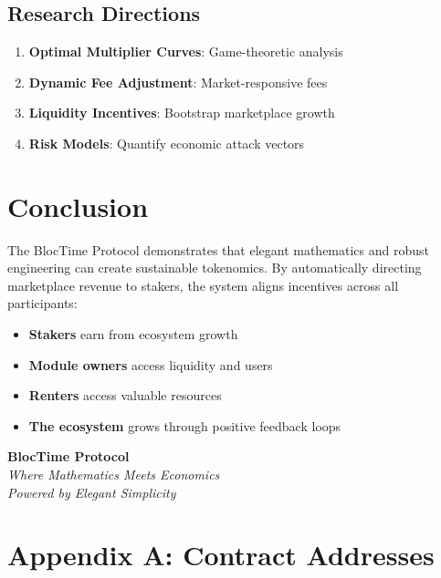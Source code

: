 \documentclass[12pt,a4paper]{article}
\begin{document}
\subsection{Research Directions}

\begin{enumerate}
    \item \textbf{Optimal Multiplier Curves}: Game-theoretic analysis
    \item \textbf{Dynamic Fee Adjustment}: Market-responsive fees
    \item \textbf{Liquidity Incentives}: Bootstrap marketplace growth
    \item \textbf{Risk Models}: Quantify economic attack vectors
\end{enumerate}

\section{Conclusion}

The BlocTime Protocol demonstrates that elegant mathematics and robust engineering can create sustainable tokenomics. By automatically directing marketplace revenue to stakers, the system aligns incentives across all participants:

\begin{itemize}
    \item \textbf{Stakers} earn from ecosystem growth
    \item \textbf{Module owners} access liquidity and users
    \item \textbf{Renters} access valuable resources
    \item \textbf{The ecosystem} grows through positive feedback loops
\end{itemize}

\vspace{1cm}

\begin{center}
\textcolor{primaryblue}{\textbf{\Large BlocTime Protocol}}\\
\vspace{0.3cm}
\textcolor{accentgold}{\textit{Where Mathematics Meets Economics}}\\
\vspace{0.3cm}
\textcolor{treasurygreen}{\textit{Powered by Elegant Simplicity}}
\end{center}

\appendix

\section{Appendix A: Contract Addresses}
\end{document}
